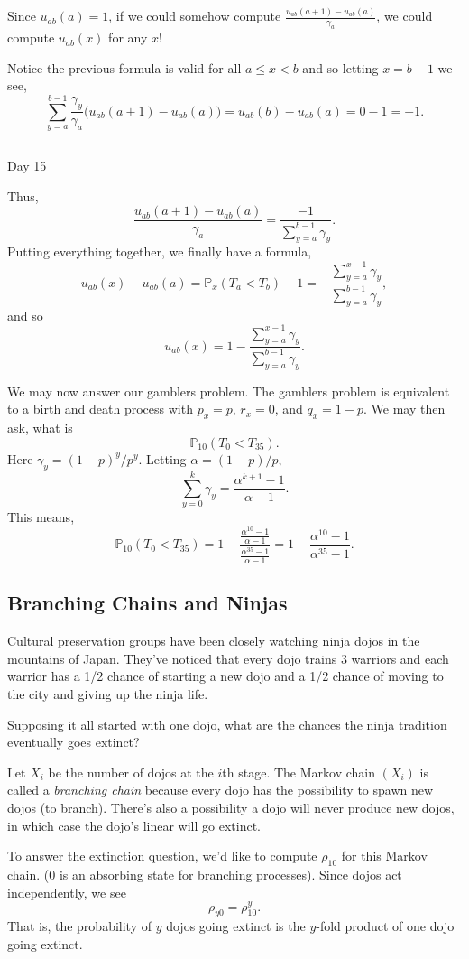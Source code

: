 \documentclass{problemset}
\renewcommand{\P}{\mathbb{P}}
\newcommand{\fatrule}[1]{\vspace{.3cm}\hrule {\hfill \sf #1}\par}
\begin{document}
	Since $u_{ab}(a)=1$, if we could somehow compute $\frac{u_{ab}(a+1)-u_{ab}(a)}{\gamma_a}$, we could compute $u_{ab}(x)$ for any $x$!

	Notice the previous formula is valid for all $a\leq x<b$ and so letting $x=b-1$ we see,
	\[
		\sum_{y=a}^{b-1} \frac{\gamma_y}{\gamma_a}\Big(u_{ab}(a+1)-u_{ab}(a)\Big)
		=u_{ab}(b)-u_{ab}(a) = 0-1=-1.
	\]

	\fatrule{Day 15}
	Thus, 
	\[
		\frac{u_{ab}(a+1)-u_{ab}(a)}{\gamma_a} = \frac{-1}{\displaystyle \sum_{y=a}^{b-1} \gamma_y}.
	\]
	Putting everything together, we finally have a formula,
	\[
		u_{ab}(x) - u_{ab}(a) = \P_x(T_a<T_b)-1 = -\frac{\sum_{y=a}^{x-1} \gamma_y}{\sum_{y=a}^{b-1}\gamma_y},
	\]
	and so
	\[
		u_{ab}(x)  = 1-\frac{\sum_{y=a}^{x-1} \gamma_y}{\sum_{y=a}^{b-1}\gamma_y}.
	\]


	\vspace{.5cm}
	We may now answer our gamblers problem.  The gamblers problem is equivalent to a birth and death 
	process with $p_x=p$, $r_x=0$, and $q_x=1-p$.  We may then ask, what is
	\[
		\P_{10}(T_0 < T_{35}).
	\]
	Here $\gamma_y = (1-p)^y/p^y$.  Letting $\alpha = (1-p)/p$,
	\[
		\sum_{y=0}^{k} \gamma_y = \frac{\alpha^{k+1}-1}{\alpha-1}.
	\]
	This means,
	\[
		\P_{10}(T_0 < T_{35}) = 1-\frac{\frac{\alpha^{10}-1}{\alpha-1}}  {\frac{\alpha^{35}-1}{\alpha-1}} = 1-\frac{\alpha^{10}-1}{\alpha^{35}-1}.
	\]

\subsection*{Branching Chains and Ninjas}

	Cultural preservation groups have been closely
	watching ninja dojos in the mountains of Japan.
	They've noticed that every dojo trains 3 warriors and
	each warrior has a 1/2 chance of starting a new
	dojo and a 1/2 chance of moving to the city and giving
	up the ninja life.

	Supposing it all started with one dojo, what are the chances
	the ninja tradition eventually goes extinct?

	Let $X_i$ be the number of dojos
	at the $i$th stage.  The Markov chain $(X_i)$ is called
	a \emph{branching chain} because every dojo has the possibility to
	spawn new dojos (to branch).  There's also a possibility a dojo will
	never produce new dojos, in which case the dojo's linear will go extinct.

	To answer the extinction question, we'd like to compute $\rho_{10}$ for this Markov chain.
	($0$ is an absorbing state for branching processes).  Since dojos act independently, we see
	\[
		\rho_{y0} = \rho_{10}^y.
	\]
	That is, the probability of $y$ dojos going extinct is the $y$-fold product of 
	one dojo going extinct.
\end{document}
